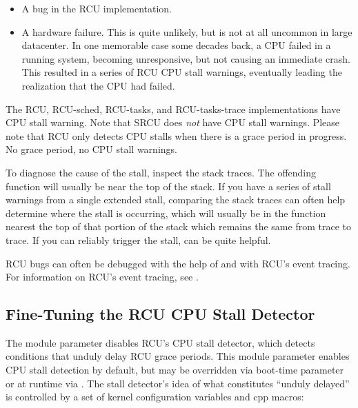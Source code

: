\begin{itemize}
\item	A bug in the RCU implementation.

\item	A hardware failure.
	This is quite unlikely, but is not at all
	uncommon in large datacenter.
	In one memorable case some decades
	back, a CPU failed in a running system, becoming unresponsive,
	but not causing an immediate crash.
	This resulted in a series
	of RCU CPU stall warnings, eventually leading the realization
	that the CPU had failed.
\end{itemize}

The RCU, RCU-sched, RCU-tasks, and RCU-tasks-trace implementations have
CPU stall warning.
Note that SRCU does \emph{not} have CPU stall warnings.
Please note that RCU only detects CPU stalls when there is a grace period
in progress.
No grace period, no CPU stall warnings.

To diagnose the cause of the stall, inspect the stack traces.
The offending function will usually be near the top of the stack.
If you have a series of stall warnings from a single extended stall,
comparing the stack traces can often help determine where the stall
is occurring, which will usually be in the function nearest the top of
that portion of the stack which remains the same from trace to trace.
If you can reliably trigger the stall,  can be quite helpful.

RCU bugs can often be debugged with the help of 
and with RCU's event tracing.
For information on RCU's event tracing,
see .


\subsection{Fine-Tuning the RCU CPU Stall Detector}

The  module parameter disables RCU's
CPU stall detector, which detects conditions that unduly delay RCU grace
periods.
This module parameter enables CPU stall detection by default,
but may be overridden via boot-time parameter or at runtime via .
The stall detector's idea of what constitutes ``unduly delayed'' is
controlled by a set of kernel configuration variables and cpp macros:

